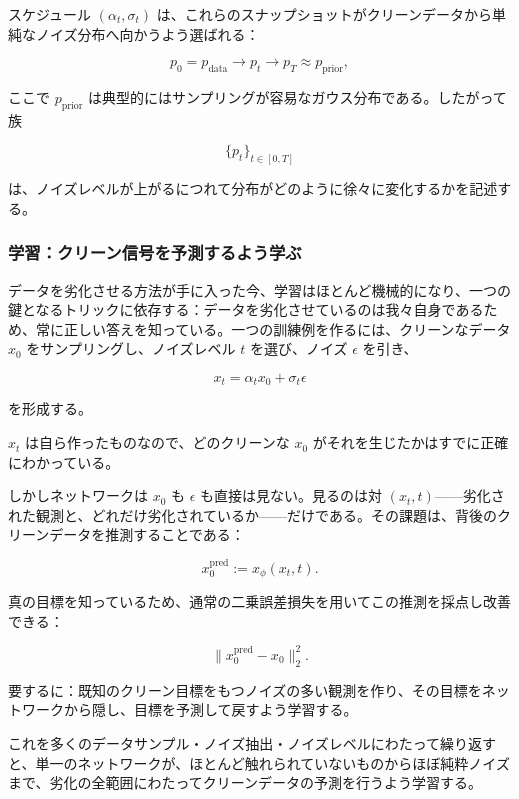 

スケジュール $(\alpha_t,\sigma_t)$ は、これらのスナップショットがクリーンデータから単純なノイズ分布へ向かうよう選ばれる：

\[
p_0 = p_{\mathrm{data}} \longrightarrow p_t \longrightarrow p_T \approx p_{\mathrm{prior}},
\]


ここで $p_{\mathrm{prior}}$ は典型的にはサンプリングが容易なガウス分布である。したがって族

\[
\{p_t\}_{t\in[0,T]}
\]


は、ノイズレベルが上がるにつれて分布がどのように徐々に変化するかを記述する。

\subsubsection*{学習：クリーン信号を予測するよう学ぶ}


データを劣化させる方法が手に入った今、学習はほとんど機械的になり、一つの鍵となるトリックに依存する：データを劣化させているのは我々自身であるため、常に正しい答えを知っている。一つの訓練例を作るには、クリーンなデータ $x_0$ をサンプリングし、ノイズレベル $t$ を選び、ノイズ $\epsilon$ を引き、

\[
x_t = \alpha_t x_0 + \sigma_t \epsilon
\]


を形成する。

$x_t$ は自ら作ったものなので、どのクリーンな $x_0$ がそれを生じたかはすでに正確にわかっている。

しかしネットワークは $x_0$ も $\epsilon$ も直接は見ない。見るのは対 $(x_t, t)$——劣化された観測と、どれだけ劣化されているか——だけである。その課題は、背後のクリーンデータを推測することである：

\[
x_0^{\mathrm{pred}} := x_\phi(x_t, t).
\]


真の目標を知っているため、通常の二乗誤差損失を用いてこの推測を採点し改善できる：

\[
\bigl\|x_0^{\mathrm{pred}} - x_0\bigr\|_2^2.
\]


\begin{propositionbox}[メッセージ]
要するに：既知のクリーン目標をもつノイズの多い観測を作り、その目標をネットワークから隠し、目標を予測して戻すよう学習する。
\end{propositionbox}


これを多くのデータサンプル・ノイズ抽出・ノイズレベルにわたって繰り返すと、単一のネットワークが、ほとんど触れられていないものからほぼ純粋ノイズまで、劣化の全範囲にわたってクリーンデータの予測を行うよう学習する。

